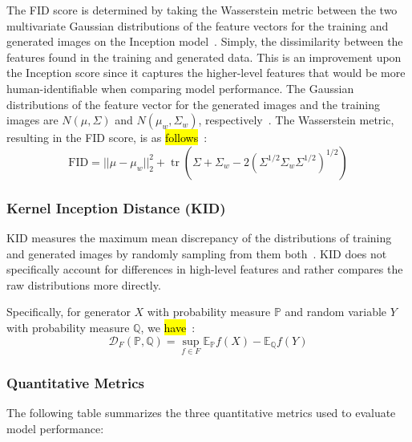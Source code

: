 \documentclass[technologies,article,accept,pdftex,moreauthors]{Definitions/mdpi}
\begin{document}
The FID score is determined by taking the Wasserstein metric between the two multivariate Gaussian distributions of the feature vectors for the training and generated images on the Inception model~\cite{NIPS2017_8a1d6947}. Simply, the dissimilarity between the features found in the training and generated data. This is an improvement upon the Inception score since it captures the higher-level features that would be more human-identifiable when comparing model performance. The Gaussian distributions of the feature vector for the generated images and the training images are $N(\mu, \Sigma)$ and $N(\mu_w, \Sigma_w)$, respectively~\cite{fid_gan}. The Wasserstein metric, resulting in the FID score, is as \hl{follows}~\cite{fid_gan}:
\begin{equation}
\text{FID}=||\mu -\mu _{w}||_{2}^{2}+\operatorname {tr} (\Sigma +\Sigma _{w}-2(\Sigma ^{1/2}\Sigma _{w}\Sigma ^{1/2})^{1/2})
\end{equation}


\subsubsection{Kernel Inception Distance (KID)}
KID measures the maximum mean discrepancy of the distributions of training and generated images by randomly sampling from them both~\cite{MMD_KID}. KID does not specifically account for differences in high-level features and rather compares the raw distributions more directly.


Specifically, for generator $X$ with probability measure $\mathbb{P}$ and random variable $Y$ with probability measure $\mathbb{Q}$, we \hl{have}~\cite{MMD_KID}:
\begin{equation}
\mathcal{D}_F(\mathbb{P},\mathbb{Q}) = \sup_{f\in F}\mathbb{E}_\mathbb{P}f(X) - \mathbb{E}_\mathbb{Q}f(Y) 
\end{equation}

\subsubsection{Quantitative Metrics}
The following table summarizes the three quantitative metrics used to evaluate model performance:
\end{document}
